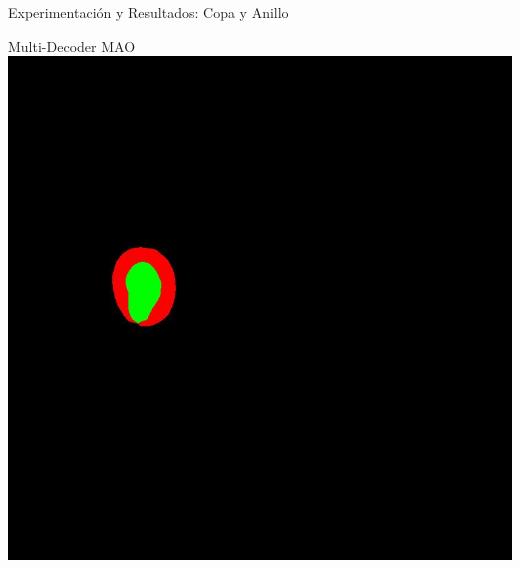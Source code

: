 \documentclass[xcolor=dvipsnames,table]{beamer}
\begin{document}
\begin{frame}{Experimentación y Resultados: Copa y Anillo}
\begin{minipage}[b]{0.13\textwidth}
	\end{minipage}\hfill
	\begin{minipage}[b]{0.13\textwidth}
		\centering
		Multi-Decoder MAO\\[0.2cm]
		\includegraphics[width=\linewidth]{my_images/video/HARDMULTIMAO.jpg}
	\end{minipage}
\end{frame}
\end{document}
